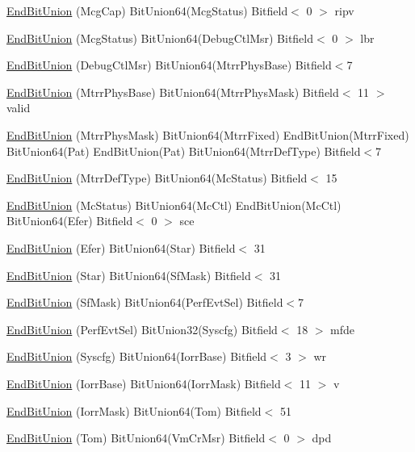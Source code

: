 \begin{DoxyCompactItemize}
\hyperlink{namespaceX86ISA_a74677b253e3ee39aae0941f8ec5d2bd0}{EndBitUnion} (McgCap) BitUnion64(McgStatus) Bitfield$<$ 0 $>$ ripv
\item 
\hyperlink{namespaceX86ISA_a502085fd93bf084e4ade6c567c3c766f}{EndBitUnion} (McgStatus) BitUnion64(DebugCtlMsr) Bitfield$<$ 0 $>$ lbr
\item 
\hyperlink{namespaceX86ISA_a63612265d014f8c5c3a82013db316e2a}{EndBitUnion} (DebugCtlMsr) BitUnion64(MtrrPhysBase) Bitfield$<$7
\item 
\hyperlink{namespaceX86ISA_a104adc3f41d2497c9d77064215abdf8f}{EndBitUnion} (MtrrPhysBase) BitUnion64(MtrrPhysMask) Bitfield$<$ 11 $>$ valid
\item 
\hyperlink{namespaceX86ISA_ada1121919d9bca5206c4fda19dcb1cd3}{EndBitUnion} (MtrrPhysMask) BitUnion64(MtrrFixed) EndBitUnion(MtrrFixed) BitUnion64(Pat) EndBitUnion(Pat) BitUnion64(MtrrDefType) Bitfield$<$7
\item 
\hyperlink{namespaceX86ISA_af1aa75957bd1b168f5e292fbe13b2465}{EndBitUnion} (MtrrDefType) BitUnion64(McStatus) Bitfield$<$ 15
\item 
\hyperlink{namespaceX86ISA_a79917c072640e1ffeaeeb0e615248677}{EndBitUnion} (McStatus) BitUnion64(McCtl) EndBitUnion(McCtl) BitUnion64(Efer) Bitfield$<$ 0 $>$ sce
\item 
\hyperlink{namespaceX86ISA_a0a2f3997f942dfaad353244cee4d010e}{EndBitUnion} (Efer) BitUnion64(Star) Bitfield$<$ 31
\item 
\hyperlink{namespaceX86ISA_a668f00fcbee02b4d057d64c22cf7e7a5}{EndBitUnion} (Star) BitUnion64(SfMask) Bitfield$<$ 31
\item 
\hyperlink{namespaceX86ISA_ab054845e6a36ccb566b48f94aeca21b4}{EndBitUnion} (SfMask) BitUnion64(PerfEvtSel) Bitfield$<$7
\item 
\hyperlink{namespaceX86ISA_a674759d7fc5b550a2c5c3f75868aac1f}{EndBitUnion} (PerfEvtSel) BitUnion32(Syscfg) Bitfield$<$ 18 $>$ mfde
\item 
\hyperlink{namespaceX86ISA_a86836e0b0df079086efece4cf5410455}{EndBitUnion} (Syscfg) BitUnion64(IorrBase) Bitfield$<$ 3 $>$ wr
\item 
\hyperlink{namespaceX86ISA_a499ad5e25e1190d0a731e36f86a74bfc}{EndBitUnion} (IorrBase) BitUnion64(IorrMask) Bitfield$<$ 11 $>$ v
\item 
\hyperlink{namespaceX86ISA_a76b9aff17d0c1da7cb62dea21f6644b4}{EndBitUnion} (IorrMask) BitUnion64(Tom) Bitfield$<$ 51
\item 
\hyperlink{namespaceX86ISA_a3cc40e149a9a3dc880196157af218ed9}{EndBitUnion} (Tom) BitUnion64(VmCrMsr) Bitfield$<$ 0 $>$ dpd

\end{DoxyCompactItemize}
